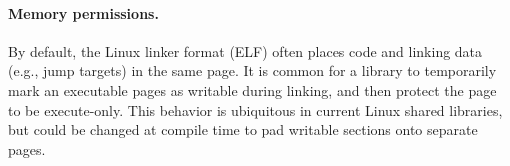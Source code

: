 




\paragraph{Memory permissions.} %
By default, the Linux linker format (ELF) often places
code and linking data (e.g., jump targets) in the same page.
It is common for a library to temporarily mark an executable pages as writable
during linking, and then protect the page to be execute-only.
This behavior is ubiquitous in current Linux shared libraries, but could be changed at compile time to pad
writable sections onto separate pages.

